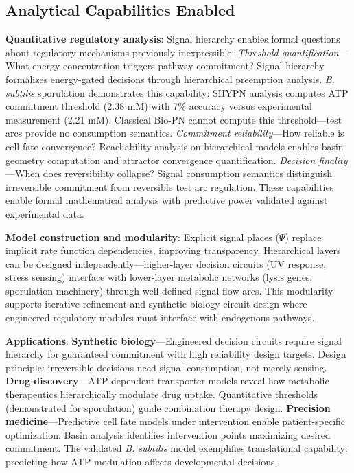 \documentclass[twocolumn,11pt]{article}
\begin{document}
\subsection{Analytical Capabilities Enabled}

\vspace{3pt}
\noindent\textbf{Quantitative regulatory analysis}: Signal hierarchy enables formal questions about regulatory mechanisms previously inexpressible: \textit{Threshold quantification}---What energy concentration triggers pathway commitment? Signal hierarchy formalizes energy-gated decisions through hierarchical preemption analysis. \textit{B. subtilis} sporulation demonstrates this capability: SHYPN analysis computes ATP commitment threshold (2.38 mM) with 7\% accuracy versus experimental measurement (2.21 mM). Classical Bio-PN cannot compute this threshold---test arcs provide no consumption semantics. \textit{Commitment reliability}---How reliable is cell fate convergence? Reachability analysis on hierarchical models enables basin geometry computation and attractor convergence quantification. \textit{Decision finality}---When does reversibility collapse? Signal consumption semantics distinguish irreversible commitment from reversible test arc regulation. These capabilities enable formal mathematical analysis with predictive power validated against experimental data.

\vspace{3pt}
\noindent\textbf{Model construction and modularity}: Explicit signal places ($\Psi$) replace implicit rate function dependencies, improving transparency. Hierarchical layers can be designed independently---higher-layer decision circuits (UV response, stress sensing) interface with lower-layer metabolic networks (lysis genes, sporulation machinery) through well-defined signal flow arcs. This modularity supports iterative refinement and synthetic biology circuit design where engineered regulatory modules must interface with endogenous pathways.

\vspace{3pt}
\noindent\textbf{Applications}: \textbf{Synthetic biology}---Engineered decision circuits require signal hierarchy for guaranteed commitment with high reliability design targets. Design principle: irreversible decisions need signal consumption, not merely sensing. \textbf{Drug discovery}---ATP-dependent transporter models reveal how metabolic therapeutics hierarchically modulate drug uptake. Quantitative thresholds (demonstrated for sporulation) guide combination therapy design. \textbf{Precision medicine}---Predictive cell fate models under intervention enable patient-specific optimization. Basin analysis identifies intervention points maximizing desired commitment. The validated \textit{B. subtilis} model exemplifies translational capability: predicting how ATP modulation affects developmental decisions.
\end{document}
